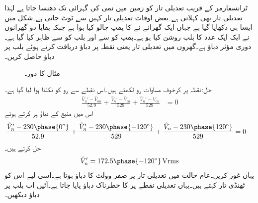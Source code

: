ٹرانسفارمر کے قریب تعدیلی تار کو زمین میں نمی کی گہرائی تک دھنسا جاتا ہے لہٰذا تعدیلی تار  بھی کہلاتی ہے۔بعض اوقات تعدیلی تار کہیں سے ٹوٹ جاتی ہے۔شکل  میں ایسا ہی دکھایا گیا ہے جہاں ایک گھرانے نے  کا پمپ چالو کیا ہوا ہے جبکہ بقایا دو گھرانوں نے ایک ایک عدد  کا بلب روشن کیا ہو ہے۔پمپ کو  سے اور بلب کو  سے ظاہر کیا گیا ہے۔دوری مؤثر دباؤ  ہے۔گھروں میں تعدیلی تار یعنی نقطہ  پر دباؤ دریافت کرتے ہوئے بلب پر دباؤ حاصل کریں۔
 \begin{figure}
\centering
{}
\caption{مثال  کا دور۔}
\label{شکل_تین_دوری_تعدیلی_تار_غیر_موجود}
\end{figure}

حل:نقطہ  پر کرخوف مساوات رو لکھتے ہیں۔اس نقطے سے رو کو نکلتا ہوا لیا گیا ہے۔ 
\begin{align*}
\frac{\hat{V}_n'-\hat{V}_{an}}{52.9}+\frac{\hat{V}_n'-\hat{V}_{bn}}{529}+\frac{\hat{V}_n'-\hat{V}_{cn}}{529}&=0
\end{align*} 
اس میں منبع کے دباؤ پر کرتے ہوئے
\begin{align*}
\frac{\hat{V}_n'-230\phase{0^{\circ}}}{52.9}+\frac{\hat{V}_n'-230\phase{-120^{\circ}}}{529}+\frac{\hat{V}_n-230\phase{120^{\circ}}}{529}&=0
\end{align*} 
حل کرتے ہیں۔
\begin{align*}
\hat{V}_n'=172.5\phase{-120^{\circ}}\,\si{\volt\rms}
\end{align*}
یہاں غور کریں۔عام حالت میں تعدیلی تار پر صفر وولٹ کا دباؤ ہوتا ہے۔اسی لیے اس کو ٹھنڈی تار کہتے ہیں۔یہاں تعدیلی نقطے پر  کا خطرناک دباؤ پایا جاتا ہے۔آئیں اب بلب پر دباؤ دیکھیں۔

